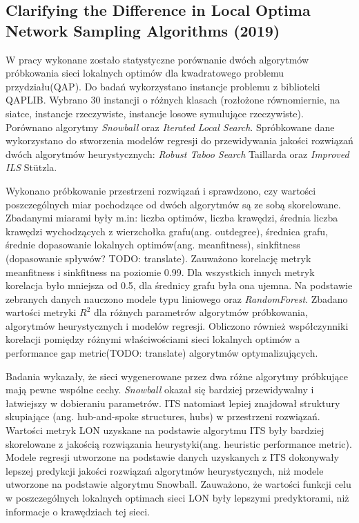 \subsection*{Clarifying the Difference in Local Optima Network Sampling Algorithms (2019) \cite{DBLP:conf/evoW/ThomsonOV19}}
W pracy wykonane zostało statystyczne porównanie dwóch algorytmów próbkowania
sieci lokalnych optimów dla kwadratowego problemu przydziału(QAP).
Do badań wykorzystano instancje problemu z biblioteki QAPLIB.
Wybrano 30 instancji o różnych klasach (rozłożone równomiernie, na siatce,
instancje rzeczywiste, instancje losowe symulujące rzeczywiste).
Porównano algorytmy \textit{Snowball} oraz \textit{Iterated Local Search}.
Spróbkowane dane wykorzystano do stworzenia modelów regresji do przewidywania jakości rozwiązań
dwóch algorytmów heurystycznych: \textit{Robust Taboo Search} Taillarda oraz \textit{Improved ILS} Stützla.

Wykonano próbkowanie przestrzeni rozwiązań i sprawdzono, czy wartości poszczególnych miar pochodzące od dwóch algorytmów
są ze sobą skorelowane.
Zbadanymi miarami były m.in: liczba optimów, liczba krawędzi, średnia liczba krawędzi wychodzących z wierzchołka grafu(ang. outdegree),
średnica grafu, średnie dopasowanie lokalnych optimów(ang. meanfitness), sinkfitness (dopasowanie spływów? TODO: translate).
Zauważono korelację metryk meanfitness i sinkfitness  na poziomie 0.99.
Dla wszystkich innych metryk korelacja było mniejsza od 0.5, dla średnicy grafu była ona ujemna.
Na podstawie zebranych danych nauczono modele typu liniowego oraz \textit{RandomForest}.
Zbadano wartości metryki $R^{2}$ dla różnych parametrów algorytmów próbkowania, algorytmów heurystycznych
i modelów regresji.
Obliczono również współczynniki korelacji pomiędzy różnymi właściwościami sieci lokalnych optimów
a performance gap metric(TODO: translate) algorytmów optymalizujących.

Badania wykazały, że sieci wygenerowane przez dwa różne algorytmy próbkujące mają pewne wspólne cechy.
\textit{Snowball} okazał się bardziej przewidywalny i łatwiejszy w dobieraniu parametrów.
ITS natomiast lepiej znajdował struktury skupiające (ang. hub-and-spoke structures, hubs) w przestrzeni rozwiązań.
Wartości metryk LON uzyskane na podstawie algorytmu ITS były bardziej skorelowane z
jakością rozwiązania heurystyki(ang. heuristic performance metric).
Modele regresji utworzone na podstawie danych uzyskanych z ITS dokonywały lepszej predykcji
jakości rozwiązań algorytmów heurystycznych, niż modele utworzone na podstawie algorytmu Snowball.
Zauważono, że wartości funkcji celu w poszczególnych lokalnych optimach sieci LON
były lepszymi predyktorami, niż informacje o krawędziach tej sieci.

